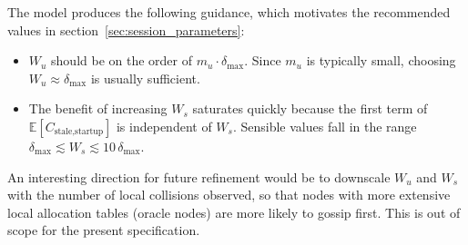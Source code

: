 The model produces the following guidance, which motivates the recommended
values in section~\ref{sec:session_parameters}:

\begin{itemize}
    \item $W_u$ should be on the order of $m_u \cdot \delta_{\max}$. Since
    $m_u$ is typically small, choosing
    $W_u \approx \delta_{\max}$ is usually sufficient.
    \item The benefit of increasing $W_s$ saturates quickly because the
    first term of $\mathbb{E}[C_{\text{stale,startup}}]$ is independent of
    $W_s$. Sensible values fall in the range
    $\delta_{\max} \lesssim W_s \lesssim 10\,\delta_{\max}$.
\end{itemize}

\begin{remark}
    An interesting direction for future refinement would be to downscale
    $W_u$ and $W_s$ with the number of local collisions observed, so that
    nodes with more extensive local allocation tables (oracle nodes) are
    more likely to gossip first. This is out of scope for the present
    specification.
\end{remark}
